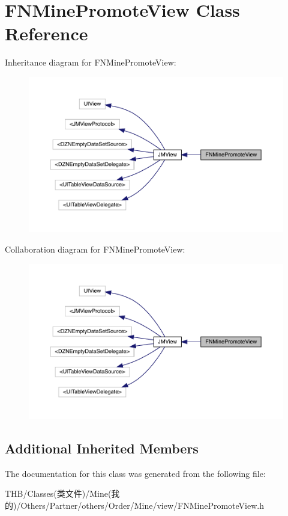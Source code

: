 \hypertarget{interface_f_n_mine_promote_view}{}\section{F\+N\+Mine\+Promote\+View Class Reference}
\label{interface_f_n_mine_promote_view}


Inheritance diagram for F\+N\+Mine\+Promote\+View\+:\nopagebreak
\begin{figure}[H]
\begin{center}
\leavevmode
\includegraphics[width=350pt]{interface_f_n_mine_promote_view__inherit__graph}
\end{center}
\end{figure}


Collaboration diagram for F\+N\+Mine\+Promote\+View\+:\nopagebreak
\begin{figure}[H]
\begin{center}
\leavevmode
\includegraphics[width=350pt]{interface_f_n_mine_promote_view__coll__graph}
\end{center}
\end{figure}
\subsection*{Additional Inherited Members}


The documentation for this class was generated from the following file\+:\begin{DoxyCompactItemize}
\item 
T\+H\+B/\+Classes(类文件)/\+Mine(我的)/\+Others/\+Partner/others/\+Order/\+Mine/view/F\+N\+Mine\+Promote\+View.\+h\end{DoxyCompactItemize}
